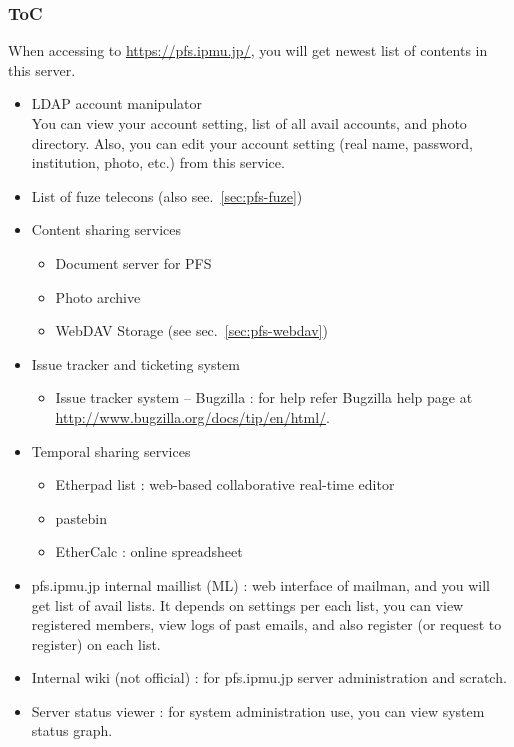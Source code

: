 \documentclass[a4paper,notitlepage]{article}
\begin{document}
\subsubsection{ToC}

When accessing to \url{https://pfs.ipmu.jp/}, you will get newest list of 
contents in this server. 

\begin{itemize}
  \item LDAP account manipulator \\
    You can view your account setting, list of all avail accounts, and photo 
    directory. 
    Also, you can edit your account setting (real name, password, institution, 
    photo, etc.) from this service.
  \item List of fuze telecons (also see.~\ref{sec:pfs-fuze})
  \item Content sharing services
    \begin{itemize}
      \item Document server for PFS
      \item Photo archive
      \item WebDAV Storage (see sec.~\ref{sec:pfs-webdav})
    \end{itemize}
  \item Issue tracker and ticketing system
    \begin{itemize}
      \item Issue tracker system -- Bugzilla : 
        for help refer Bugzilla help page at 
        \url{http://www.bugzilla.org/docs/tip/en/html/}.
    \end{itemize}
  \item Temporal sharing services
    \begin{itemize}
      \item Etherpad list : web-based collaborative real-time editor
      \item pastebin
      \item EtherCalc : online spreadsheet
    \end{itemize}
  \item pfs.ipmu.jp internal maillist (ML) :
    web interface of mailman, and you will get list of avail lists. 
    It depends on settings per each list, you can view registered members, 
    view logs of past emails, and also register (or request to register) on 
    each list. 
  \item Internal wiki (not official) : 
    for pfs.ipmu.jp server administration and scratch. 
  \item Server status viewer : 
    for system administration use, you can view system status graph.
\end{itemize}
\end{document}
